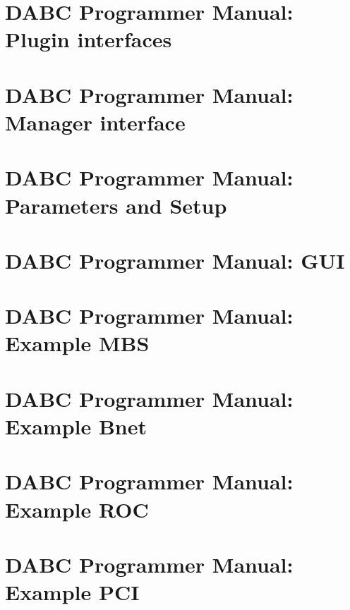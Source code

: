 
 \cleardoublepage
\chapter{DABC Programmer Manual: Plugin interfaces}
 \cleardoublepage

\chapter{DABC Programmer Manual: Manager interface}
 \cleardoublepage

\chapter{DABC Programmer Manual: Parameters and Setup}
 \cleardoublepage
\chapter{DABC Programmer Manual: GUI}
 \cleardoublepage
\chapter{DABC Programmer Manual: Example MBS}
 \cleardoublepage
\chapter{DABC Programmer Manual: Example Bnet}
 \cleardoublepage
\chapter{DABC Programmer Manual: Example ROC}
 \cleardoublepage
\chapter{DABC Programmer Manual: Example PCI}
 \cleardoublepage